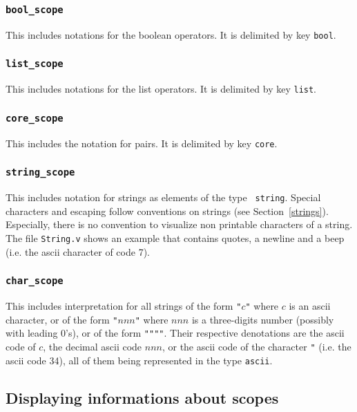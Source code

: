 \subsubsection{\tt bool\_scope}

This includes notations for the boolean operators. It is
delimited by key {\tt bool}.

\subsubsection{\tt list\_scope}

This includes notations for the list operators. It is
delimited by key {\tt list}.

\subsubsection{\tt core\_scope}

This includes the notation for pairs. It is delimited by key {\tt core}.

\subsubsection{\tt string\_scope}

This includes notation for strings as elements of the type {\tt
string}.  Special characters and escaping follow {\Coq} conventions
on strings (see Section~\ref{strings}). Especially, there is no
convention to visualize non printable characters of a string.  The
file {\tt String.v} shows an example that contains quotes, a newline
and a beep (i.e. the ascii character of code 7).

\subsubsection{\tt char\_scope}

This includes interpretation for all strings of the form
\verb!"!$c$\verb!"! where $c$ is an ascii character, or of the form
\verb!"!$nnn$\verb!"! where $nnn$ is a three-digits number (possibly
with leading 0's), or of the form \verb!""""!. Their respective
denotations are the ascii code of $c$, the decimal ascii code $nnn$,
or the ascii code of the character \verb!"! (i.e. the ascii code
34), all of them being represented in the type {\tt ascii}.

\subsection{Displaying informations about scopes}

